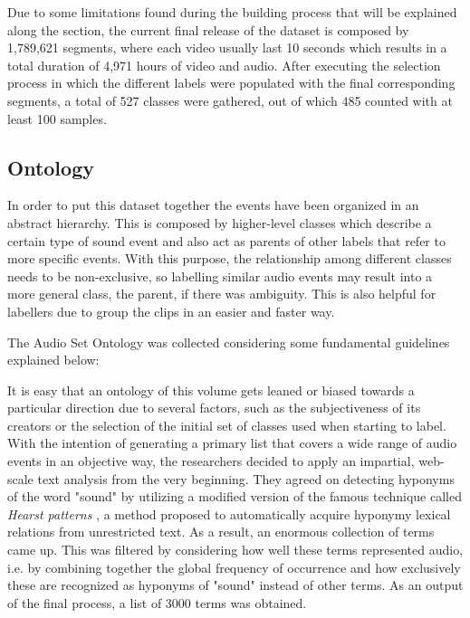 	Due to some limitations found during the building process that will be explained along the section, the current final release of the dataset is composed by 1,789,621 segments, where each video usually last 10 seconds which results in a total duration of 4,971 hours of video and audio. After executing the selection process in which the different labels were populated with the final corresponding segments, a total of 527 classes were gathered, out of which 485 counted with at least 100 samples.

\subsection{Ontology}
\label{subsecition:ontology}

	In order to put this dataset together the events have been organized in an abstract hierarchy. This is composed by higher-level classes which describe a certain type of sound event and also act as parents of other labels that refer to more specific events. With this purpose, the relationship among different classes needs to be non-exclusive, so labelling similar audio events may result into a more general class, the parent, if there was ambiguity. This is also helpful for labellers due to group the clips in an easier and faster way.
	
	The Audio Set Ontology was collected considering some fundamental guidelines explained below:
	
	
	It is easy that an ontology of this volume gets leaned or biased towards a particular direction due to several factors, such as the subjectiveness of its creators or the selection of the initial set of classes used when starting to label. With the intention of generating a primary list that covers a wide range of audio events in an objective way, the researchers decided to apply an impartial, web-scale text analysis from the very beginning. They agreed on detecting hyponyms of the word "sound" by utilizing a modified version of the famous technique called \textit{Hearst patterns} \cite{Hearst1992}, a method proposed to automatically acquire hyponymy lexical relations from unrestricted text. As a result, an enormous collection of terms came up. This was filtered by considering how well these terms represented audio, i.e. by combining together the global frequency of occurrence and how exclusively these are recognized as hyponyms of "sound" instead of other terms. As an output of the final process, a list of 3000 terms was obtained.
	
